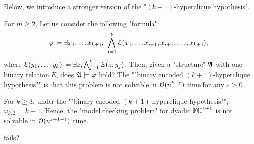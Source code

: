 Below, we introduce a stronger version of the "$(k+1)$-hyperclique hypothesis".
\begin{hypothesis}\label{hypothesis: binary encoded hyperclique hypothesis}
For $m \ge 2$,
Let us consider the following "formula":
\[\fml \defeq \exists x_1, \dots x_{k+1},\ \bigwedge_{j = 1}^{k} \mathcal{E}(x_1, \dots x_{i-1}, x_{i+1}, \dots, x_{k+1}),\]
where $\mathcal{E}(y_1, \dots, y_k) \coloneq \exists z, \bigwedge_{j = 1}^{k} E(z, y_j)$.
Then, given a "structure" $\struc$ with one binary relation $E$,
does $\struc \models \fml$ hold?
The ""binary encoded $(k+1)$-hyperclique hypothesis"" is that this problem is not solvable in $\mathcal{O}(n^{k - \varepsilon})$ time for any $\varepsilon > 0$.\lipicsEnd
\end{hypothesis}
\begin{yoshiki}

\end{yoshiki}

\begin{proposition}\label{proposition: binary encoded hyperclique hypothesis}
    For $k \ge 3$, under the ""binary encoded $(k+1)$-hyperclique hypothesis"", $\omega_{k, 2} = k+1$.
    Hence, the "model checking problem" for dyadic $\mathbb{FO}^{k+1}$ is not solvable in $\mathcal{O}(n^{k + 1 - \varepsilon})$ time.
\end{proposition}

\begin{problem}
   fails?
\end{problem}

\begin{yoshiki}
\end{yoshiki}


